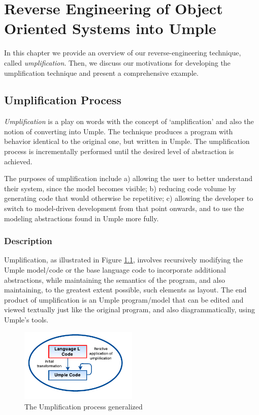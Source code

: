 \lhead{\emph{\leftmark}} 
\chapter{Reverse Engineering of Object Oriented Systems into Umple}
\label{chap:core}

In this chapter we provide an overview of our reverse-engineering technique, called \textit{umplification}. Then, we discuss our motivations for developing the umplification technique and present a comprehensive example. 

\section{Umplification Process}

\textit{Umplification} is a play on words with the concept of `amplification' and also the notion of converting into Umple. The technique produces a program with behavior identical to the original one, but written in Umple. The umplification process is incrementally performed until the desired level of abstraction is achieved. 

The purposes of umplification include a) allowing the user to better understand their system, since the model becomes visible; b) reducing code volume by generating code that would otherwise be repetitive; c) allowing the developer to switch to model-driven development from that point onwards, and to use the modeling abstractions found in Umple more fully.

\subsection{Description}
Umplification, as illustrated in Figure \ref{fig:umplificationLoop}, involves recursively modifying the Umple model/code or the base language code to incorporate additional abstractions, while maintaining the semantics of the program, and also maintaining, to the greatest extent possible, such elements as layout. The end product of umplification is an Umple program/model that can be edited and viewed textually just like the original program, and also diagrammatically, using Umple's tools. 

\begin{figure}[h]
\centering
\includegraphics[width=0.50\textwidth]{Figures/UmplificationProcess.pdf}
\caption{The Umplification process generalized}
\label{fig:umplificationLoop}
\end{figure}

